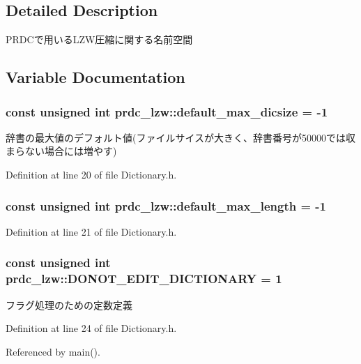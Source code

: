 \subsection{Detailed Description}
P\-R\-D\-Cで用いる\-L\-Z\-W圧縮に関する名前空間 

\subsection{Variable Documentation}
\hypertarget{namespaceprdc__lzw_a32802f5b39a1712fd52ea244bed3abc6}{
\subsubsection[{default\-\_\-max\-\_\-dicsize}]{\setlength{\rightskip}{0pt plus 5cm}const unsigned int prdc\-\_\-lzw\-::default\-\_\-max\-\_\-dicsize = -\/1}}\label{namespaceprdc__lzw_a32802f5b39a1712fd52ea244bed3abc6}


辞書の最大値のデフォルト値(ファイルサイスが大きく、辞書番号が50000では収まらない場合には増やす) 



Definition at line 20 of file Dictionary.\-h.

\hypertarget{namespaceprdc__lzw_a563099246f7864f678056d3c7e583dbf}{
\subsubsection[{default\-\_\-max\-\_\-length}]{\setlength{\rightskip}{0pt plus 5cm}const unsigned int prdc\-\_\-lzw\-::default\-\_\-max\-\_\-length = -\/1}}\label{namespaceprdc__lzw_a563099246f7864f678056d3c7e583dbf}


Definition at line 21 of file Dictionary.\-h.

\hypertarget{namespaceprdc__lzw_acf8cc481fd2dd6347b910b0c0befdc84}{
\subsubsection[{D\-O\-N\-O\-T\-\_\-\-E\-D\-I\-T\-\_\-\-D\-I\-C\-T\-I\-O\-N\-A\-R\-Y}]{\setlength{\rightskip}{0pt plus 5cm}const unsigned int prdc\-\_\-lzw\-::\-D\-O\-N\-O\-T\-\_\-\-E\-D\-I\-T\-\_\-\-D\-I\-C\-T\-I\-O\-N\-A\-R\-Y = 1}}\label{namespaceprdc__lzw_acf8cc481fd2dd6347b910b0c0befdc84}


フラグ処理のための定数定義 



Definition at line 24 of file Dictionary.\-h.



Referenced by main().

